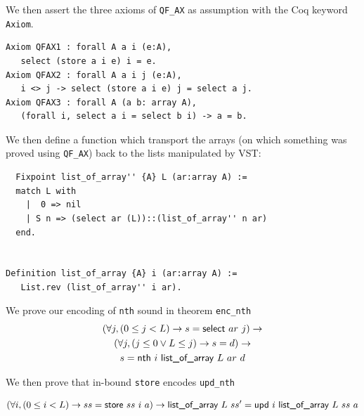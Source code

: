 \documentclass[onecolumn, preprint]{sigplanconf}
\newcommand{\select}[2]{\textsf{select } #1\ #2}
\newcommand{\store}[3]{\textsf{store } #1\ #2\ #3}
\newcommand{\loa}[2]{\textsf{list\_of\_array } #1\ #2}
\newcommand{\nth}[3]{\textsf{nth } #1\ #2\ #3}
\newcommand{\unth}[3]{\textsf{upd } #1\ #2\ #3}
\begin{document}
We then assert the three axioms of \lstinline|QF_AX| as assumption with the Coq keyword \lstinline|Axiom|.

\begin{lstlisting}
Axiom QFAX1 : forall A a i (e:A),
   select (store a i e) i = e.  
Axiom QFAX2 : forall A a i j (e:A),
   i <> j -> select (store a i e) j = select a j.  
Axiom QFAX3 : forall A (a b: array A),
   (forall i, select a i = select b i) -> a = b.  
\end{lstlisting}

We then define a function which transport the arrays (on which something was proved using \lstinline|QF_AX|) back to the lists manipulated by VST:

\begin{lstlisting}
  Fixpoint list_of_array'' {A} L (ar:array A) :=
  match L with
    |  0 => nil
    | S n => (select ar (L))::(list_of_array'' n ar)
  end.


Definition list_of_array {A} i (ar:array A) :=
   List.rev (list_of_array'' i ar).
\end{lstlisting}





We prove our encoding of \lstinline|nth| sound in theorem \lstinline|enc_nth|
\begin{multline*}
  (\forall j, (0 \leq j < L) \to s = \select{ar}{j}) \to \\
  (\forall j, (j \leq 0 \vee L \leq j) \to s = d) \to \\
  s = \nth{i}{\loa{L}{ar}}{d} $$
\end{multline*}
  
\begin{comment}
\begin{lstlisting}
Theorem enc_nth: forall A  L j (ar:array A) (ls:list A) (s:A)  (d:A),
  ((0 <= j < L) -> s = select ar j) /\
  (( j < 0 \/ L <= j) -> s = d) ->
  (s = nth j (list_of_array L ar) d).
\end{lstlisting}
\end{comment}






We then prove that in-bound \lstinline|store| encodes \lstinline|upd_nth| 

\begin{multline*}
  (\forall i, (0 \leq i < L) \to ss = \store{ss}{i}{a}) \to 
     \loa{L}{ss'} = \unth{i}{\loa{L}{ss}}{a}$$
\end{multline*}
\end{document}

